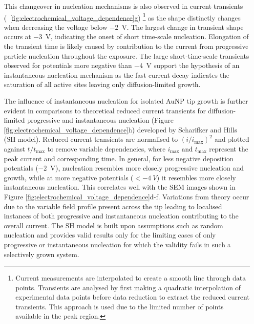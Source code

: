 \documentclass{article}
\begin{document}
This changeover in nucleation mechanisms is also observed in current transients (\figurename~\ref{fig:electrochemical_voltage_dependence}g)%
\footnote{Current measurements are interpolated to create a smooth line through data points. Transients are analysed by first making a quadratic interpolation of experimental data points before data reduction to extract the reduced current transients. This approach is used due to the limited number of points available in the peak region.}
as the shape distinctly changes when decreasing the voltage below \SI{-2}{V}. The largest change in transient shape occurs at \SI{-3}{V}, indicating the onset of short time-scale nucleation. Elongation of the transient time is likely caused by contribution to the current from progressive particle nucleation throughout the exposure. The large short-time-scale transients observed for potentials more negative than \SI{-4}{V} support the hypothesis of an instantaneous nucleation mechanism as the fast current decay indicates the saturation of all active sites leaving only diffusion-limited growth.

The influence of instantaneous nucleation for isolated AuNP tip growth is further evident in comparisons to theoretical reduced current transients for diffusion-limited progressive and instantaneous nucleation (Figure \ref{fig:electrochemical_voltage_dependence}h) developed by Scharifker and Hills (SH model)\cite{scharifker1983}. Reduced current transients are normalised to $(i/i_{\mathrm{max}})^2$ and plotted against $t/t_{\mathrm{max}}$ to remove variable dependencies, where $i_{\mathrm{max}}$ and $t_{\mathrm{max}}$ represent the peak current and corresponding time. In general, for less negative deposition potentials (\SI{-2}{V}), nucleation resembles more closely progressive nucleation and growth, while at more negative potentials ($< \SI{-4}{V}$) it resembles more closely instantaneous nucleation. This correlates well with the SEM images shown in Figure \ref{fig:electrochemical_voltage_dependence}d-f. Variations from theory occur due to the variable field profile present across the tip leading to localised instances of both progressive and instantaneous nucleation contributing to the overall current. The SH model is built upon assumptions such as random nucleation and provides valid results only for the limiting cases of only progressive or instantaneous nucleation for which the validity fails in such a selectively grown system\cite{dudin2010}.
\end{document}

